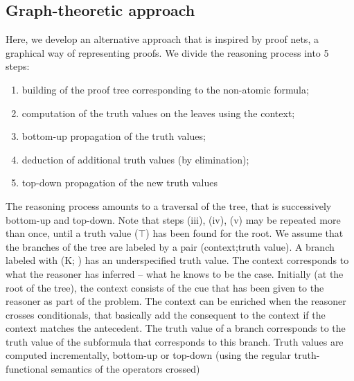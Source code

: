 \documentclass[french]{article}
\begin{document}
\subsection{Graph-theoretic approach}
Here, we develop an alternative approach that is inspired by proof nets, a graphical way of representing proofs. We divide the reasoning process into 5 steps:
\begin{enumerate}[label=(\roman*)]
	\item building of the proof tree corresponding to the non-atomic formula;
	\item computation of the truth values on the leaves using the context;
	\item bottom-up propagation of the truth values;
	\item deduction of additional truth values (by elimination);
	\item top-down propagation of the new truth values
\end{enumerate}
The reasoning process amounts to a traversal of the tree, that is successively bottom-up and top-down. Note that steps (iii), (iv), (v) may be repeated more than once, until a truth value ($\top$) has been found for the root. We assume that the branches of the tree are labeled by a pair (context;truth value). A branch labeled with (K; ) has an underspecified truth value. The context corresponds to what the reasoner has inferred -- what he knows to be the case. Initially (at the root of the tree), the context consists of the cue that has been given to the reasoner as part of the problem. The context can be enriched when the reasoner crosses conditionals, that basically add the consequent to the context if the context matches the antecedent. The truth value of a branch corresponds to the truth value of the subformula that corresponds to this branch. Truth values are computed incrementally, bottom-up or top-down (using the regular truth-functional semantics of the operators crossed)\\
\end{document}
